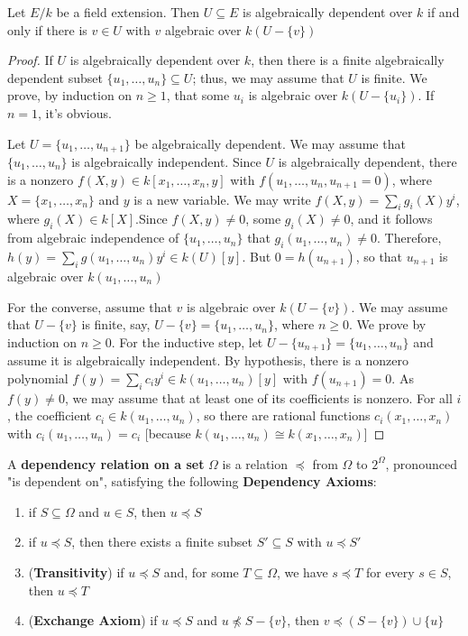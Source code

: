 \documentclass[11pt]{article}
\begin{document}
\begin{proposition}[]
\label{nprop5.66}
Let \(E/k\) be a field extension. Then \(U\subseteq E\) is algebraically
dependent over \(k\) if and only if there is \(v\in U\) with \(v\) algebraic
over \(k(U-\{v\})\)
\end{proposition}

\begin{proof}
If \(U\) is algebraically dependent over \(k\), then there is a finite
algebraically dependent subset \(\{u_1,\dots,u_n\}\subseteq U\); thus, we may
assume that \(U\) is finite. We prove, by induction on \(n\ge1\), that some
\(u_i\) is algebraic over \(k(U-\{u_i\})\). If \(n=1\), it's obvious.

Let \(U=\{u_1,\dots,u_{n+1}\}\) be algebraically dependent. We may assume
that \(\{u_1,\dots,u_n\}\) is algebraically independent. Since \(U\) is
algebraically dependent, there is a nonzero 
\(f(X,y)\in k[x_1,\dots,x_n,y]\) with \(f(u_1,\dots,u_n,u_{n+1}=0)\), where
\(X=\{x_1,\dots,x_n\}\) and \(y\) is a new variable. We may write 
\(f(X,y)=\sum_ig_i(X)y^i\), where \(g_i(X)\in k[X]\).Since \(f(X,y)\neq0\),
some \(g_i(X)\neq0\), and it follows from algebraic independence of
\(\{u_1,\dots,u_n\}\) that \(g_i(u_1,\dots,u_n)\neq0\). Therefore,
\(h(y)=\sum_ig(u_1,\dots,u_n)y^i\in k(U)[y]\). But \(0=h(u_{n+1})\), so that
\(u_{n+1}\) is algebraic over \(k(u_1,\dots,u_n)\)

For the converse, assume that \(v\) is algebraic over \(k(U-\{v\})\). We may
assume that \(U-\{v\}\) is finite, say, \(U-\{v\}=\{u_1,\dots,u_n\}\), where
\(n\ge0\). We prove by induction on \(n\ge0\). For the inductive step, let 
\(U-\{u_{n+1}\}=\{u_1,\dots,u_n\}\) and assume it is algebraically
independent. By hypothesis, there is a nonzero polynomial 
\(f(y)=\sum_ic_iy^i\in k(u_1,\dots,u_n)[y]\) with \(f(u_{n+1})=0\). As
\(f(y)\neq0\), we may assume that at least one of its coefficients is
nonzero. For all \(i\), the coefficient \(c_i\in k(u_1,\dots,u_n)\), so there
are rational functions \(c_i(x_1,\dots,x_n)\) with
\(c_i(u_1,\dots,u_n)=c_i\) [because 
\(k(u_1,\dots,u_n)\cong k(x_1,\dots,x_n)\)]
\end{proof}

\begin{definition}[]
A \textbf{dependency relation on a set} \(\Omega\) is a relation \(\preceq\) from \(\Omega\)
to \(2^\Omega\), pronounced "is dependent on", satisfying the following 
\textbf{Dependency Axioms}:
\begin{enumerate}
\item if \(S\subseteq\Omega\) and \(u\in S\), then \(u\preceq S\)
\item if \(u\preceq S\), then there exists a finite subset \(S'\subseteq S\)
with \(u\preceq S'\)
\item (\textbf{Transitivity}) if \(u\preceq S\) and, for some \(T\subseteq\Omega\), we
have \(s\preceq T\) for every \(s\in S\), then \(u\preceq T\)
\item (\textbf{Exchange Axiom}) if \(u\preceq S\) and \(u\not\preceq S-\{v\}\), then
\(v\preceq (S-\{v\})\cup\{u\}\)
\end{enumerate}
\end{definition}
\end{document}

